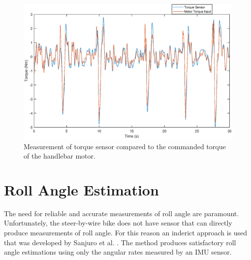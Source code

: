 \begin{figure}[h]
    \centering
    \captionsetup{justification=centering,margin=2cm}

    \includegraphics[scale=0.5]{images/results_torque_sensor.eps}
        \caption[Short title]{Measurement of torque sensor compared to the commanded torque of the handlebar motor.}
    \label{fig:figure7}
\end{figure}

\section{Roll Angle Estimation}
The need for reliable and accurate measurements of roll angle are paramount. Unfortunately, the steer-by-wire bike does not have sensor that can directly produce measurements of roll angle. For this reason an inderict approach is used that was developed by Sanjuro et al. \cite{sanjurjo2018roll}. The method produces satisfactory roll angle estimations using only the angular rates measured by an IMU sensor.

